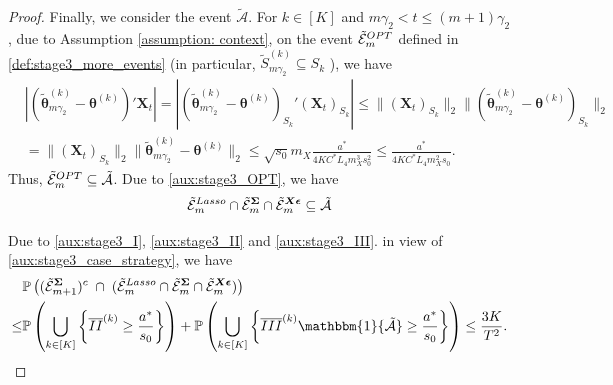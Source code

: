 \documentclass[10pt,a4paper]{amsart}
\newcommand{\Pro}{\mathbb{P}}
\newcommand{\bSigma}{\boldsymbol{\Sigma}}
\newcommand{\bX}{\boldsymbol{X}}
\newcommand{\bd}[1]{\boldsymbol{#1}}
\newcommand{\bepsilon}{\bd{\epsilon}}
\newcommand{\btheta}{\boldsymbol{\theta}}
\newcommand{\cA}{\mathcal{A}}
\newcommand{\idf}{\mathbbm{1}}
\newcommand{\mE}{\mathcal{E}}
\newcommand{\tS}{\tilde{S}}
\newcommand{\tbtheta}{\widetilde{\boldsymbol{\theta}}}
\begin{document}
\begin{proof}
Finally, we consider the event $\tilde{\cA}$.
For $k\in[K]$ and $m\gamma_2< t \le (m+1)\gamma_2$,  due to Assumption \ref{assumption: context}, on the event $\tilde{\mE}_m^{\textup{OPT}}$ defined in \eqref{def:stage3_more_events} (in particular, $\tS_{m\gamma_2}^{(k)}\subseteq S_k$ ), we have
\begin{align*}
   & |(\tbtheta_{m\gamma_2}^{(k)}-\btheta^{(k)})'\bX_t| = |(\tbtheta_{m\gamma_2}^{(k)}-\btheta^{(k)})_{S_k}' (\bX_t)_{S_k}| \le \|(\bX_t)_{S_k}\|_2 \|(\tbtheta_{m\gamma_2}^{(k)}-\btheta^{(k)})_{S_k} \|_2
    \\&= \|(\bX_t)_{S_k}\|_2 \|\tbtheta_{m\gamma_2}^{(k)}-\btheta^{(k)} \|_2
    \le \sqrt{s_0} m_X \frac{a^*}{4KC^*L_4 m_X^3 s_0^2}\le   \frac{a^*}{4KC^*L_4 m_X^2 s_0}.
\end{align*}
Thus,   $ \tilde{\mE}_m^{\textup{OPT}} \subseteq \tilde{\mathcal{A}}$.  Due to \eqref{aux:stage3_OPT}, we have
$$
\tilde{\mE}_{m}^{\textup{Lasso}} \cap \tilde{\mE}_{m}^{\bSigma}  \cap \tilde{\mE}_{m}^{\bX\bepsilon}  \subseteq \tilde{\cA}
$$

 
Due to \eqref{aux:stage3_I},  \eqref{aux:stage3_II} and  \eqref{aux:stage3_III}. in view of \eqref{aux:stage3_case_strategy}, we have
\begin{align}\label{aux:stage3_step4}
\begin{split}
        &\Pro\left( (\tilde{\mE}_{m+1}^{\bSigma})^c\; \cap \;  (\tilde{\mE}_{m}^{\textup{Lasso}} \cap \tilde{\mE}_{m}^{\bSigma}  \cap \tilde{\mE}_{m}^{\bX\bepsilon} )  \right) \\
    \leq
    &\Pro\left( \bigcup_{k \in [K]} \left\{ \overline{II}^{(k)}  \geq \frac{a^*}{s_0}\right\} \right) + \Pro\left(\bigcup_{k \in [K]} \left\{\overline{III}^{(k)} \idf\{\tilde{\cA}\} \geq\frac{a^*}{ s_0}\right\}\right) \leq \frac{3K}{T^2}.
    \end{split}
 \end{align}

 

 



\end{proof}
\end{document}
